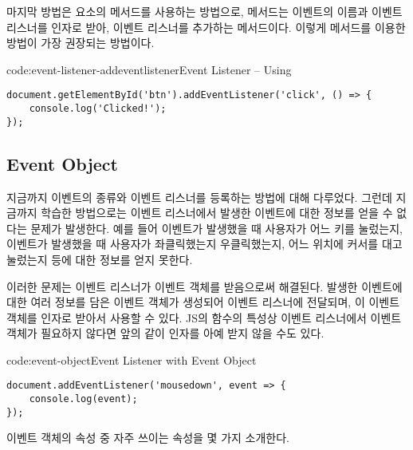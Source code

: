 마지막 방법은 요소의  메서드를 사용하는 방법으로,  메서드는 이벤트의 이름과 이벤트 리스너를 인자로 받아, 이벤트 리스너를 추가하는 메서드이다. 이렇게  메서드를 이용한 방법이 가장 권장되는 방법이다.

\begin{codeenv}{code:event-listener-addeventlistener}{Event Listener – Using }\begin{verbatim}
document.getElementById('btn').addEventListener('click', () => {
    console.log('Clicked!');
});
\end{verbatim}
\end{codeenv}

\subsection*{Event Object}

지금까지 이벤트의 종류와 이벤트 리스너를 등록하는 방법에 대해 다루었다. 그런데 지금까지 학습한 방법으로는 이벤트 리스너에서 발생한 이벤트에 대한 정보를 얻을 수 없다는 문제가 발생한다. 예를 들어  이벤트가 발생했을 때 사용자가 어느 키를 눌렀는지,  이벤트가 발생했을 때 사용자가 좌클릭했는지 우클릭했는지, 어느 위치에 커서를 대고 눌렀는지 등에 대한 정보를 얻지 못한다.

이러한 문제는 이벤트 리스너가 이벤트 객체를 받음으로써 해결된다. 발생한 이벤트에 대한 여러 정보를 담은 이벤트 객체가 생성되어 이벤트 리스너에 전달되며, 이 이벤트 객체를 인자로 받아서 사용할 수 있다. JS의 함수의 특성상 이벤트 리스너에서 이벤트 객체가 필요하지 않다면 앞의 \와 같이 인자를 아예 받지 않을 수도 있다.


\begin{codeenv}{code:event-object}{Event Listener with Event Object}\begin{verbatim}
document.addEventListener('mousedown', event => {
    console.log(event);
});
\end{verbatim}
\end{codeenv}

이벤트 객체의 속성 중 자주 쓰이는 속성을 몇 가지 소개한다.

